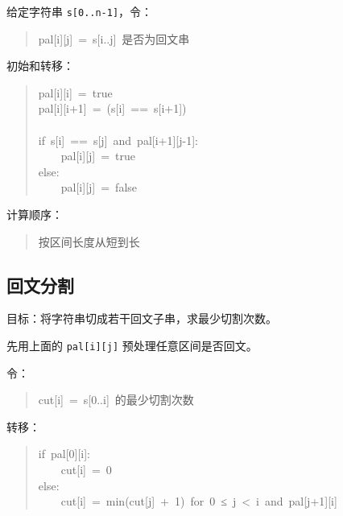 \documentclass[UTF8,zihao=-4]{ctexart}
\begin{document}
给定字符串 \texttt{s[0..n-1]}，令：

\begin{quote}
\small\ttfamily\raggedright
\relax pal[i][j]\ =\ s[i..j]\ 是否为回文串\\
\end{quote}

初始和转移：

\begin{quote}
\small\ttfamily\raggedright
\relax pal[i][i]\ =\ true\\
\relax pal[i][i+1]\ =\ (s[i]\ ==\ s[i+1])\\
\mbox{}\\
\relax if\ s[i]\ ==\ s[j]\ and\ pal[i+1][j-1]:\\
\relax \ \ \ \ pal[i][j]\ =\ true\\
\relax else:\\
\relax \ \ \ \ pal[i][j]\ =\ false\\
\end{quote}

计算顺序：

\begin{quote}
\small\ttfamily\raggedright
\relax 按区间长度从短到长\\
\end{quote}

\subsection*{回文分割}

目标：将字符串切成若干回文子串，求最少切割次数。

先用上面的 \texttt{pal[i][j]} 预处理任意区间是否回文。

令：

\begin{quote}
\small\ttfamily\raggedright
\relax cut[i]\ =\ s[0..i]\ 的最少切割次数\\
\end{quote}

转移：

\begin{quote}
\small\ttfamily\raggedright
\relax if\ pal[0][i]:\\
\relax \ \ \ \ cut[i]\ =\ 0\\
\relax else:\\
\relax \ \ \ \ cut[i]\ =\ min(cut[j]\ +\ 1)\ for\ 0\ ≤\ j\ <\ i\ and\ pal[j+1][i]\\
\end{quote}
\end{document}
